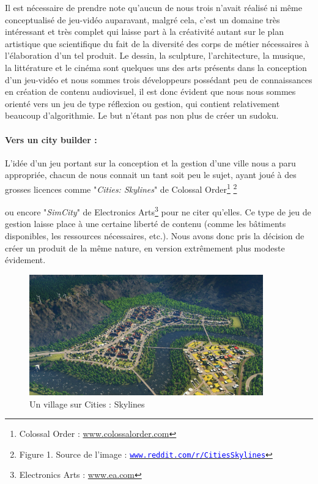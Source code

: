 \documentclass[a4paper,10pt,openany,oneside]{report}
\newcommand\blfootnote[1]{%
  \begingroup
  \renewcommand\thefootnote{}\footnote{#1}%
  \addtocounter{footnote}{-1}%
  \endgroup
}
\begin{document}
Il est nécessaire de prendre note qu'aucun de nous trois n'avait réalisé ni même conceptualisé de jeu-vidéo auparavant, malgré cela, c'est un domaine très intéressant et très complet qui laisse part à la créativité autant sur le plan artistique que scientifique du fait de la diversité des corps de métier nécessaires à l'élaboration d'un tel produit. Le dessin, la sculpture, l'architecture, la musique, la littérature et le cinéma sont quelques uns des arts présents dans la conception d'un jeu-vidéo et nous sommes trois développeurs possédant peu de connaissances en création de contenu audiovisuel, il est donc évident que nous nous sommes orienté vers un jeu de type réflexion ou gestion, qui contient relativement beaucoup d'algorithmie. Le but n'étant pas non plus de créer un sudoku.

\paragraph{Vers un city builder :}
L'idée d'un jeu portant sur la conception et la gestion d'une ville nous a paru appropriée, chacun de nous connait un tant soit peu le sujet, ayant joué à des grosses licences comme "\textit{Cities: Skylines}" de Colossal Order\footnote{Colossal Order : \textcolor{blue}{\url{www.colossalorder.com}}}
\blfootnote{\hspace{7pt}Figure 1. Source de l'image : \href{https://www.reddit.com/r/CitiesSkylines/comments/3mubt5/finally_my_first_city_in_more_then_80_hours_i/}{\texttt{\textcolor{blue}{www.reddit.com/r/CitiesSkylines}}}}
 ou encore "\textit{SimCity}" de Electronics Arts\footnote{Electronics Arts : \textcolor{blue}{\url{www.ea.com}}} pour ne citer qu'elles. Ce type de jeu de gestion laisse place à une certaine liberté de contenu (comme les bâtiments disponibles, les ressources nécessaires, etc.). Nous avons donc pris la décision de créer un produit de la même nature, en version extrêmement plus modeste évidement.
\begin{center}
	\begin{figure}[h]
	\centering
	\includegraphics[width=0.9\textwidth]{img/img_intro_cscity.jpg}
	\caption{\label{fig:Cities: Skylines city}Un village sur Cities : Skylines}
	\end{figure}
\end{center}
\end{document}
